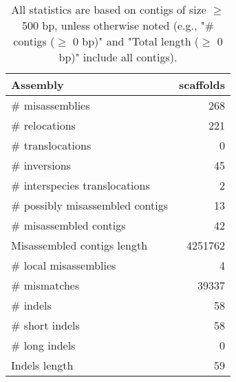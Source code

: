 \documentclass[12pt,a4paper]{article}
\begin{document}
\begin{table}[ht]
\begin{center}
\caption{All statistics are based on contigs of size $\geq$ 500 bp, unless otherwise noted (e.g., "\# contigs ($\geq$ 0 bp)" and "Total length ($\geq$ 0 bp)" include all contigs).}
\begin{tabular}{|l*{1}{|r}|}
\hline
Assembly & scaffolds \\ \hline
\# misassemblies & 268 \\ \hline
\hspace{5mm}\# relocations & 221 \\ \hline
\hspace{5mm}\# translocations & 0 \\ \hline
\hspace{5mm}\# inversions & 45 \\ \hline
\hspace{5mm}\# interspecies translocations & 2 \\ \hline
\# possibly misassembled contigs & 13 \\ \hline
\# misassembled contigs & 42 \\ \hline
Misassembled contigs length & 4251762 \\ \hline
\# local misassemblies & 4 \\ \hline
\# mismatches & 39337 \\ \hline
\# indels & 58 \\ \hline
\hspace{5mm}\# short indels & 58 \\ \hline
\hspace{5mm}\# long indels & 0 \\ \hline
Indels length & 59 \\ \hline
\end{tabular}
\end{center}
\end{table}
\end{document}
